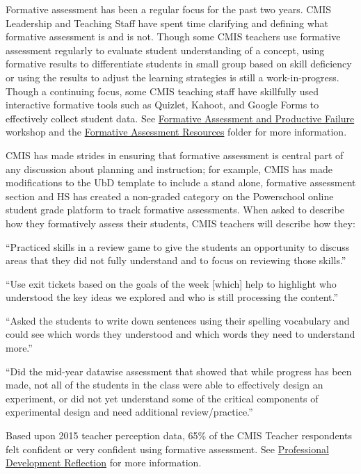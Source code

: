 \begin{findings}
Formative assessment has been a regular focus for the past two years. CMIS Leadership and Teaching Staff have spent time clarifying and defining what formative assessment is and is not. Though some CMIS teachers use formative assessment regularly to evaluate student understanding of a concept,  using formative results to differentiate students in small group based on skill deficiency or using the results to adjust the learning strategies is still a work-in-progress. Though a continuing focus, some CMIS teaching staff have skillfully used interactive formative tools such as Quizlet, Kahoot, and Google Forms to effectively collect student data. See \href{https://docs.google.com/a/cmis.ac.th/presentation/d/1S1x1yEj7KDD6jM7u1RdTZJEt10_0r6mcJ-LmRb6iPWs/edit?usp=sharing}{Formative Assessment and Productive Failure} workshop and the \href{https://drive.google.com/drive/folders/0ByVFfrm0zfolaFNZMDVFZnFLazA?usp=sharing}{Formative Assessment Resources} folder for more information. 

CMIS has made strides in ensuring that formative assessment is central part of any discussion about planning and instruction; for example, CMIS has made modifications to the UbD template  to include a stand alone, formative assessment section and HS has created a non-graded category on the Powerschool online student grade platform to track formative assessments. When asked to describe how they formatively assess their students, CMIS teachers will describe how they:

``Practiced skills in a review game to give the students an opportunity to discuss areas that they did  not fully understand and to focus on reviewing those skills.''

``Use exit tickets based on the goals of the week [which] help to highlight who understood the key ideas we explored and who is still processing the content.''

``Asked the students to write down sentences using their spelling vocabulary and could see which words they understood and which words they need to understand more.''

``Did the mid-year datawise assessment that showed that while progress has been made, not all of the students in the class were able to effectively design an experiment, or did not yet understand some of the critical components of experimental design and need additional review/practice.''

Based upon 2015 teacher perception data, 65\% of the CMIS Teacher respondents felt confident or very confident using formative assessment. See \href{https://docs.google.com/a/cmis.ac.th/forms/d/1-00JLey-jyLuizymm8z8JGJ6iLp4l-ccsTgHJ_Ckcj8/viewanalytics}{Professional Development Reflection} for more information. 


\end{findings}

